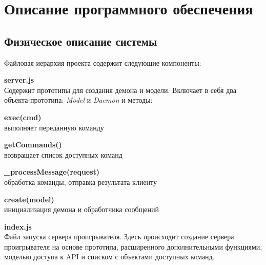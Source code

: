 \section{Описание программного обеспечения}

\subsection{Физическое описание системы}

Файловая иерархия проекта содержит следующие компоненты:

\begin{itemize}

  \begin{item}

   \textbf{server.js} \\
    Содержит прототипы для создания демона и модели. Включает в себя
    два объекта-прототипа: \textit{Model} и \textit{Daemon} и методы:

    \begin{itemize}
        \begin{item}
          \textbf{exec(cmd)} \\
          выполняет переданную команду
        \end{item}
        \begin{item}
          \textbf{getCommands()} \\
          возвращает список доступных команд
        \end{item}
        \begin{item}
          \textbf{\_processMessage(request)} \\
          обработка команды, отправка результата клиенту
        \end{item}
        \begin{item}
          \textbf{create(model)} \\
          инициализация демона и обработчика сообщений
        \end{item}
    \end{itemize}

  \end{item}

  \begin{item}

    \textbf{index.js} \\
    Файл запуска сервера проигрывателя. Здесь происходит создание
    сервера проигрывателя на основе прототипа, расширенного
    дополнительными функциями, моделью доступа к API и списком с
    объектами доступных команд.
    

\end{item}
\end{itemize}
